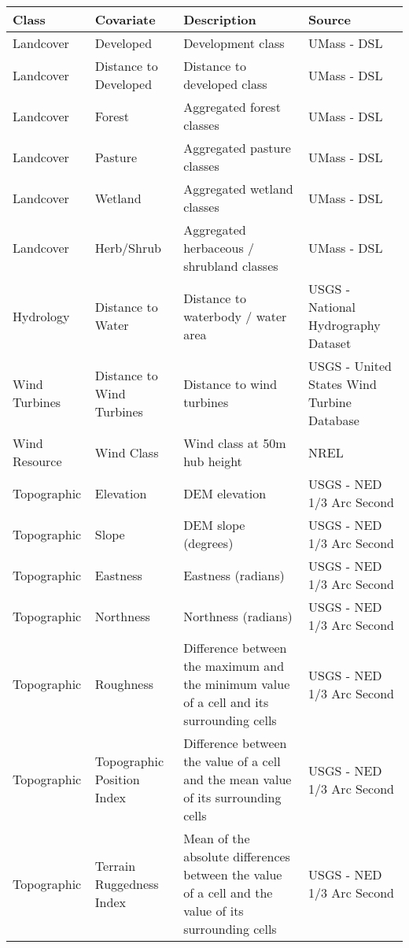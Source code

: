 \begingroup\fontsize{11pt}{12pt}\selectfont
\begin{tabularx}{\textwidth}{L{.7}L{.8}L{1.6}L{.9}}
  \toprule
{\textbf{Class}} & {\textbf{Covariate}} & {\textbf{Description}} & {\textbf{Source}} \\ 
  \midrule
Landcover & Developed & Development class & UMass - DSL \\ 
  Landcover & Distance to Developed & Distance to developed class & UMass - DSL \\ 
  Landcover & Forest & Aggregated forest classes & UMass - DSL \\ 
  Landcover & Pasture & Aggregated pasture classes & UMass - DSL \\ 
  Landcover & Wetland & Aggregated wetland classes & UMass - DSL \\ 
  Landcover & Herb/Shrub & Aggregated herbaceous / shrubland classes & UMass - DSL \\ 
  Hydrology & Distance to Water & Distance to waterbody / water area & USGS - National Hydrography Dataset \\ 
  Wind Turbines & Distance to Wind Turbines & Distance to wind turbines & USGS - United States Wind Turbine Database \\ 
  Wind Resource & Wind Class & Wind class at 50m hub height & NREL \\ 
  Topographic & Elevation & DEM elevation & USGS - NED 1/3 Arc Second \\ 
  Topographic & Slope & DEM slope (degrees) & USGS - NED 1/3 Arc Second \\ 
  Topographic & Eastness & Eastness (radians) & USGS - NED 1/3 Arc Second \\ 
  Topographic & Northness & Northness (radians) & USGS - NED 1/3 Arc Second \\ 
  Topographic & Roughness & Difference between the maximum and the minimum value of a cell and its surrounding cells & USGS - NED 1/3 Arc Second \\ 
  Topographic & Topographic Position Index & Difference between the value of a cell and the mean value of its surrounding cells & USGS - NED 1/3 Arc Second \\ 
  Topographic & Terrain Ruggedness Index & Mean of the absolute differences between the value of a cell and the value of its surrounding cells & USGS - NED 1/3 Arc Second \\ 
   \bottomrule
\end{tabularx}
\endgroup
